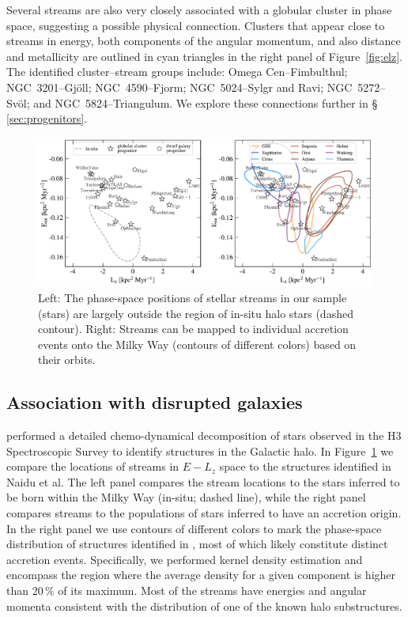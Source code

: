 \documentclass[twocolumn]{aastex63}
\begin{document}
Several streams are also very closely associated with a globular cluster in phase space, suggesting a possible physical connection.
Clusters that appear close to streams in energy, both components of the angular momentum, and also distance and metallicity are outlined in cyan triangles in the right panel of Figure~\ref{fig:elz}.
The identified cluster--stream groups include: Omega Cen--Fimbulthul; NGC~3201--Gj\" oll; NGC~4590--Fjorm; NGC~5024--Sylgr and Ravi; NGC~5272--Sv\" ol; and NGC~5824--Triangulum.
We explore these connections further in \S\,\ref{sec:progenitors}.

\begin{figure}
\begin{center}
\includegraphics[width=\textwidth]{stream_hosts.pdf}
\end{center}
\caption{
Left: The phase-space positions of stellar streams in our sample (stars) are largely outside the region of in-situ halo stars (dashed contour).
Right: Streams can be mapped to individual accretion events onto the Milky Way (contours of different colors) based on their orbits.
}
\label{fig:hosts}
\end{figure}


\subsection{Association with disrupted galaxies}
\label{sec:hosts}

\citet{naidu2020} performed a detailed chemo-dynamical decomposition of stars observed in the H3 Spectroscopic Survey to identify structures in the Galactic halo.
In Figure~\ref{fig:hosts} we compare the locations of streams in $E-L_z$ space to the structures identified in Naidu et al.
The left panel compares the stream locations to the stars inferred to be born within the Milky Way (in-situ; dashed line), while the right panel compares streams to the populations of stars inferred to have an accretion origin.
In the right panel we use contours of different colors to mark the phase-space distribution of structures identified in \citet{naidu2020}, most of which likely constitute distinct accretion events.
Specifically, we performed kernel density estimation and encompass the region where the average density for a given component is higher than 20\,\% of its maximum.
Most of the streams have energies and angular momenta consistent with the distribution of one of the known halo substructures.
\end{document}
